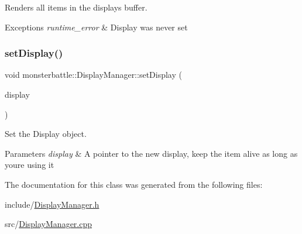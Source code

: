 Renders all items in the display\textquotesingle{}s buffer. 


\begin{DoxyExceptions}{Exceptions}
{\em runtime\+\_\+error} & Display was never set \\
\hline
\end{DoxyExceptions}
\mbox{\label{classmonsterbattle_1_1DisplayManager_a3caf2bc163be4945bf4148e31717fc70}} 
\subsubsection{\texorpdfstring{set\+Display()}{setDisplay()}}
{\footnotesize\ttfamily void monsterbattle\+::\+Display\+Manager\+::set\+Display (\begin{DoxyParamCaption}\item[{\hyperlink{structmonsterbattle_1_1IDisplay}{I\+Display} $\ast$}]{display }\end{DoxyParamCaption})}



Set the Display object. 


\begin{DoxyParams}{Parameters}
{\em display} & A pointer to the new display, keep the item alive as long as you\textquotesingle{}re using it \\
\hline
\end{DoxyParams}


The documentation for this class was generated from the following files\+:\begin{DoxyCompactItemize}
\item 
include/\hyperlink{DisplayManager_8h}{Display\+Manager.\+h}\item 
src/\hyperlink{DisplayManager_8cpp}{Display\+Manager.\+cpp}\end{DoxyCompactItemize}
